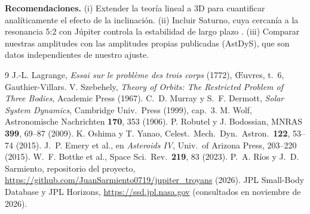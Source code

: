 \documentclass[11pt, a4paper]{article}
\begin{document}
\textbf{Recomendaciones.} (i) Extender la teoría lineal a 3D para cuantificar analíticamente el efecto de la inclinación. (ii) Incluir Saturno, cuya cercanía a la resonancia 5:2 con Júpiter controla la estabilidad de largo plazo \cite{robutel}. (iii) Comparar nuestras amplitudes con las amplitudes propias publicadas (AstDyS), que son datos independientes de nuestro ajuste.

\begin{thebibliography}{9}\small\setlength\itemsep{0pt}
 J.-L. Lagrange, \emph{Essai sur le problème des trois corps} (1772), Œuvres, t.~6, Gauthier-Villars.
 V. Szebehely, \emph{Theory of Orbits: The Restricted Problem of Three Bodies}, Academic Press (1967).
 C.~D. Murray y S.~F. Dermott, \emph{Solar System Dynamics}, Cambridge Univ.\ Press (1999), cap.~3.
 M. Wolf, Astronomische Nachrichten \textbf{170}, 353 (1906).
 P. Robutel y J. Bodossian, MNRAS \textbf{399}, 69--87 (2009).
 K. Oshima y T. Yanao, Celest.\ Mech.\ Dyn.\ Astron.\ \textbf{122}, 53--74 (2015).
 J.~P. Emery et al., en \emph{Asteroids IV}, Univ.\ of Arizona Press, 203--220 (2015).
 W.~F. Bottke et al., Space Sci.\ Rev.\ \textbf{219}, 83 (2023).
 P.~A. Ríos y J.~D. Sarmiento, repositorio del proyecto, \url{https://github.com/JuanSarmiento0719/jupiter_troyans} (2026).
 JPL Small-Body Database y JPL Horizons, \url{https://ssd.jpl.nasa.gov} (consultados en noviembre de 2026).
\end{thebibliography}
\end{document}
